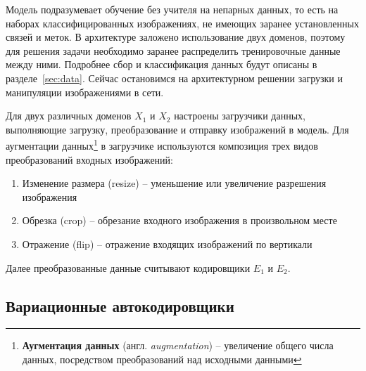 \documentclass[11pt,a4paper]{extarticle}
\begin{document}
{		Модель подразумевает обучение без учителя на непарных данных, то есть на наборах классифицированных изображениях, не имеющих заранее установленных связей и меток.
		В архитектуре заложено использование двух доменов, поэтому для решения задачи необходимо заранее распределить тренировочные данные между ними.
		Подробнее сбор и классификация данных будут описаны в разделе~\ref{sec:data}. Сейчас остановимся на архитектурном решении загрузки и манипуляции изображениями в сети.

		Для двух различных доменов \(X_1\) и \(X_2\) настроены загрузчики данных, выполняющие загрузку, преобразование и отправку изображений в модель.
		Для аугментации данных\footnote{
			\textbf{Аугментация данных} (англ. \textit{augmentation}) -- увеличение общего числа данных, посредством преобразований над исходными данными 
		}
		в загрузчике используются композиция трех видов преобразований входных изображений:

		\begin{enumerate}
			\item Изменение размера (resize) -- уменьшение или увеличение разрешения изображения
			\item Обрезка (crop) -- обрезание входного изображения в произвольном месте
			\item Отражение (flip) -- отражение входящих изображений по вертикали
		\end{enumerate}
		\noindent
		Далее преобразованные данные считывают кодировщики \(E_1\) и \(E_2\).

	\subsection{Вариационные автокодировщики}\label{sec:model:vae}

}
\end{document}
